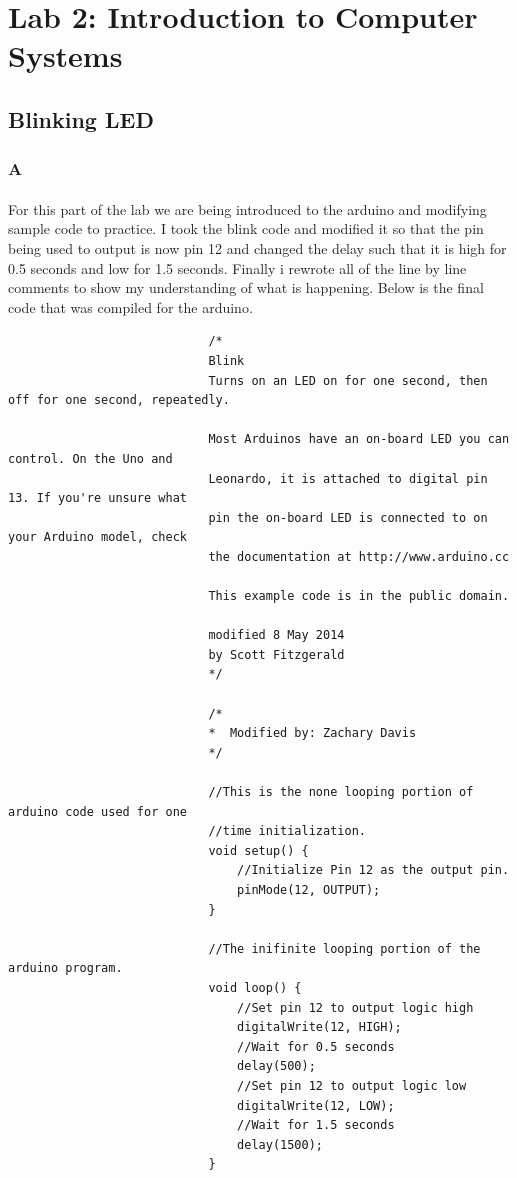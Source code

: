 \documentclass[12pt]{article}
\begin{document}
	\section{Lab 2: Introduction to Computer Systems}
		\subsection{Blinking LED}
			\subsubsection{A}
				\paragraph{}	
					For this part of the lab we are being introduced to the arduino and modifying sample code to practice.  I took the blink code and 
					modified it so that the pin being used to output is now pin 12 and changed the delay such that it is high for 0.5 seconds and low
					for 1.5 seconds.  Finally i rewrote all of the line by line comments to show my understanding of what is happening.  Below is the final
					code that was compiled for the arduino.

					\begin{center}
						\begin{verbatim}
							/*
							Blink
							Turns on an LED on for one second, then off for one second, repeatedly.

  							Most Arduinos have an on-board LED you can control. On the Uno and
  							Leonardo, it is attached to digital pin 13. If you're unsure what
  							pin the on-board LED is connected to on your Arduino model, check
  							the documentation at http://www.arduino.cc

  							This example code is in the public domain.

  							modified 8 May 2014
  							by Scott Fitzgerald
 							*/

 							/*
  							*  Modified by: Zachary Davis
  							*/

							//This is the none looping portion of arduino code used for one
							//time initialization.
							void setup() {
 								//Initialize Pin 12 as the output pin.
 			 					pinMode(12, OUTPUT);
							}

							//The inifinite looping portion of the arduino program.
							void loop() {
  								//Set pin 12 to output logic high
  								digitalWrite(12, HIGH); 
  								//Wait for 0.5 seconds  
  								delay(500);         
  								//Set pin 12 to output logic low     
  								digitalWrite(12, LOW);
  								//Wait for 1.5 seconds    
  								delay(1500);              
							}
						\end{verbatim}
					\end{center}
			
\end{document}
